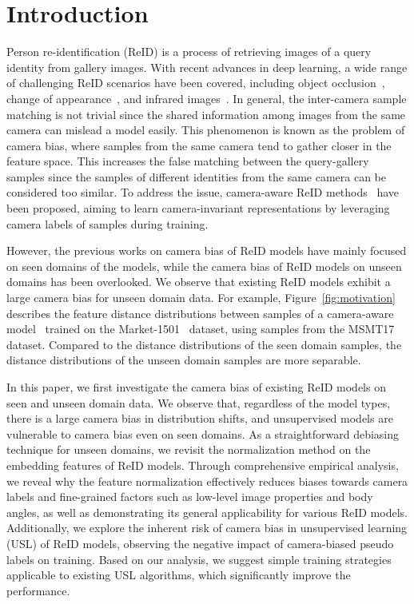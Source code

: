 \section{Introduction}
\label{sec:introduction}
Person re-identification (ReID) is a process of retrieving images of a query identity from gallery images.
With recent advances in deep learning, a wide range of challenging ReID scenarios have been covered, including object occlusion~\citep{miao2019pose,somers2023body}, change of appearance~\citep{jin2022cloth}, and infrared images~\citep{wu2017rgb,wu2023unsupervised}.
In general, the inter-camera sample matching is not trivial since the shared information among images from the same camera can mislead a model easily.
This phenomenon is known as the problem of camera bias, where samples from the same camera tend to gather closer in the feature space.
This increases the false matching between the query-gallery samples since the samples of different identities from the same camera can be considered too similar.
To address the issue, camera-aware ReID methods~\citep{luo2020generalizing,wang2021camera,chen2021ice,cho2022part,lee2023camera} have been proposed, aiming to learn camera-invariant representations by leveraging camera labels of samples during training.

However, the previous works on camera bias of ReID models have mainly focused on seen domains of the models, while 
the camera bias of ReID models on unseen domains has been overlooked.
We observe that existing ReID models exhibit a large camera bias for unseen domain data. 
For example, Figure~\ref{fig:motivation} describes the feature distance distributions between samples of a camera-aware model~\citep{cho2022part} trained on the Market-1501~\citep{market} dataset, using samples from the MSMT17~\citep{msmt} dataset.
Compared to the distance distributions of the seen domain samples, the distance distributions of the unseen domain samples are more separable.

In this paper, we first investigate the camera bias of existing ReID models on seen and unseen domain data.
We observe that, regardless of the model types, there is a large camera bias in distribution shifts, and unsupervised models are vulnerable to camera bias even on seen domains.
As a straightforward debiasing technique for unseen domains, we revisit the normalization method on the embedding features of ReID models.
Through comprehensive empirical analysis, we reveal why the feature normalization effectively reduces biases towards camera labels and fine-grained factors such as low-level image properties and body angles, as well as demonstrating its general applicability for various ReID models.
Additionally, we explore the inherent risk of camera bias in unsupervised learning (USL) of ReID models, observing the negative impact of camera-biased pseudo labels on training.
Based on our analysis, we suggest simple training strategies applicable to existing USL algorithms, which significantly improve the performance.

